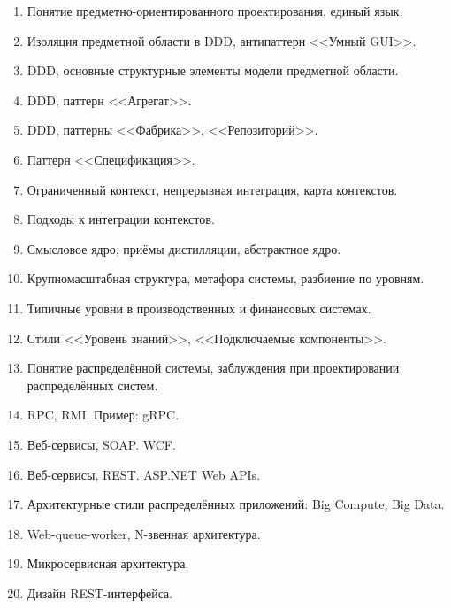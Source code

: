 \documentclass[a5paper]{article}
\begin{document}
\begin{enumerate}
    \item Понятие предметно-ориентированного проектирования, единый язык.
    \item Изоляция предметной области в DDD, антипаттерн <<Умный GUI>>.
    \item DDD, основные структурные элементы модели предметной области.
    \item DDD, паттерн <<Агрегат>>.
    \item DDD, паттерны <<Фабрика>>, <<Репозиторий>>.
    \item Паттерн <<Спецификация>>.
    \item Ограниченный контекст, непрерывная интеграция, карта контекстов.
    \item Подходы к интеграции контекстов.
    \item Смысловое ядро, приёмы дистилляции, абстрактное ядро.
    \item Крупномасштабная структура, метафора системы, разбиение по уровням. 
    \item Типичные уровни в производственных и финансовых системах.
    \item Стили <<Уровень знаний>>, <<Подключаемые компоненты>>.
    \item Понятие распределённой системы, заблуждения при проектировании распределённых систем.
    \item RPC, RMI. Пример: gRPC.
    \item Веб-сервисы, SOAP. WCF.
    \item Веб-сервисы, REST. ASP.NET Web APIs.
    \item Архитектурные стили распределённых приложений: Big Compute, Big Data.
    \item Web-queue-worker, N-звенная архитектура.
    \item Микросервисная архитектура.
    \item Дизайн REST-интерфейса.


\end{enumerate}
\end{document}
